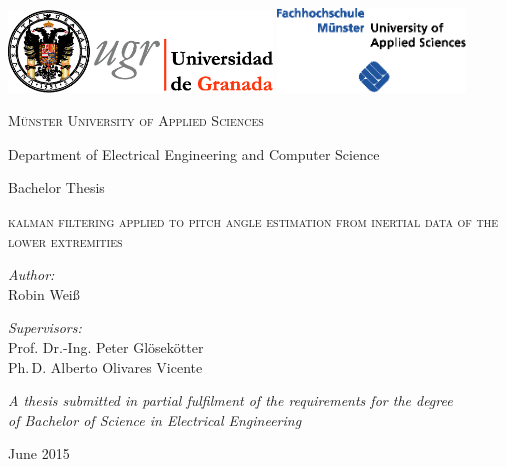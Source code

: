\begin{titlepage}
\label{ch:titlepage}

\begin{center}

\includegraphics[width=7cm]{Figures/universidad_de_granada.eps}
	\hfill
\includegraphics[width=5cm]{Figures/fh-muenster.eps} 

\vspace{2.5cm}

{\large \textsc{Münster University of Applied Sciences}}

Department of Electrical Engineering and Computer Science

\vspace{1.5cm}

{\large Bachelor Thesis}

\vspace{0.8cm}

\begin{LARGE}
\textsc{kalman filtering applied to pitch angle estimation from inertial data of the lower extremities}
\end{LARGE}

\vspace{1.8cm}

\begin{minipage}{0.4\textwidth}
\begin{flushleft}
\emph{Author:} \\
Robin Weiß
\end{flushleft}
\end{minipage}
\hfill
\begin{minipage}{0.5\textwidth}
\begin{flushright}
\emph{Supervisors:} \\
Prof. Dr.-Ing. Peter Glösekötter \\
Ph.\,D. Alberto Olivares Vicente %
\end{flushright}
\end{minipage}

\vspace{2.0cm}
	
\textit{A thesis submitted in partial fulfilment of the requirements for the degree\\
of Bachelor of Science in Electrical Engineering}

\vfill

June 2015 

\end{center}

\end{titlepage}

